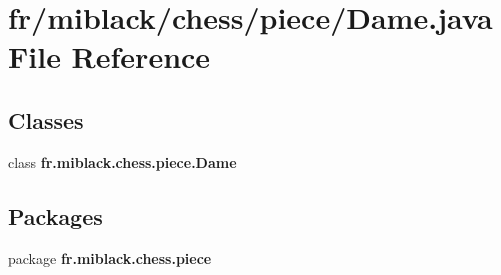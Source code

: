 \section{fr/miblack/chess/piece/\-Dame.java File Reference}
\label{Dame_8java}
\subsection*{Classes}
\begin{DoxyCompactItemize}
\item 
class {\bf fr.\-miblack.\-chess.\-piece.\-Dame}
\end{DoxyCompactItemize}
\subsection*{Packages}
\begin{DoxyCompactItemize}
\item 
package {\bf fr.\-miblack.\-chess.\-piece}
\end{DoxyCompactItemize}
